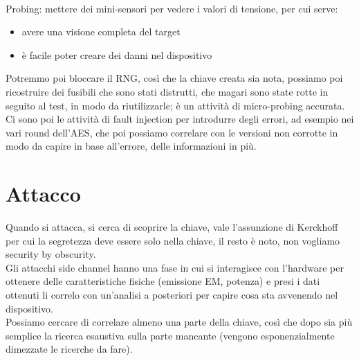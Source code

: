 \documentclass[oneside, 12pt]{extbook}
\begin{document}
\\Probing: mettere dei mini-sensori per vedere i valori di tensione, per cui serve:
\begin{itemize}
	\item avere una visione completa del target
	\item è facile poter creare dei danni nel dispositivo
\end{itemize}
Potremmo poi bloccare il RNG, così che la chiave creata sia nota, possiamo poi ricostruire dei fusibili che sono stati distrutti, che magari sono state rotte in seguito al test, in modo da riutilizzarle; è un attività di micro-probing accurata.
\\Ci sono poi le attività di fault injection per introdurre degli errori, ad esempio nei vari round dell'AES, che poi possiamo correlare con le versioni non corrotte in modo da capire in base all'errore, delle informazioni in più.

\section{Attacco}
Quando si attacca, si cerca di scoprire la chiave, vale l'assunzione di Kerckhoff per cui la segretezza deve essere solo nella chiave, il resto è noto, non vogliamo security by obscurity.
\\Gli attacchi side channel hanno una fase in cui si interagisce con l'hardware per ottenere delle caratteristiche fisiche (emissione EM, potenza) e presi i dati ottenuti li correlo con un'analisi a posteriori per capire cosa sta avvenendo nel dispositivo.
\\Possiamo cercare di correlare almeno una parte della chiave, così che dopo sia più semplice la ricerca esaustiva sulla parte mancante (vengono esponenzialmente dimezzate le ricerche da fare).
\end{document}
